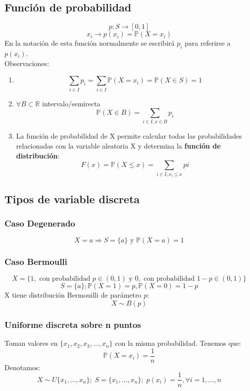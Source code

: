 \documentclass[11pt]{article}
\newcommand{\R}{\mathbb{R}}
\newcommand{\prob}{\mathbb{P}}
\theoremstyle{plain}
\begin{document}
        \subsection{Función de probabilidad} %
        \label{sub:función_de_probabilidad}
            \[p:S \rightarrow [0,1]\]
            \[x_i \rightarrow p(x_i) = \prob(X=x_i)\]
        En la notación de esta función normalmente se escribirá $p_i$ para referirse a $p(x_i)$.\\
        Observaciones:
        \begin{enumerate}[label=\Alph*]
            \item \[\sum_{i\in I} p_i = \sum_{i\in I} \prob(X = x_i) = \prob(X \in S) = 1\]
            \item $\forall B \subset \R$ intervalo/semirecta 
            \[\prob(X\in B) = \sum_{i\in I, x\in B} p_i\]
            \item La función de probabilidad de X permite calcular todas las probabilidades relacionadas con la variable aleatoria X y determina la \textbf{función de distribución}:
            \[F(x) = \prob(X\le x) = \sum_{i\in I, x_i \le x} pi\]
        \end{enumerate}
        \subsection{Tipos de variable discreta} %
        \label{sub:tipos_de_variable_discreta}
            \subsubsection{Caso Degenerado} %
            \label{subsub:caso_degenerado}
                \[X = a \Rightarrow S = \{a\} \text{ y } \prob(X=a) = 1\]
            \subsubsection{Caso Bermoulli} %
            \label{subsub:caso_bermoulli}
                \[X = \{1, \text{ con probabilidad }p\in(0,1)\text{ y } 0,\text{ con probabilidad } 1 -p\in(0,1) \}\]
                \[S = \{a\}; \prob(X=1) = p, \prob(X=0) = 1 - p \]
                X tiene distribución Bermouilli de parámetro $p$:
                \[X \sim B(p) \]
            \subsubsection{Uniforme discreta sobre n puntos} %
            \label{subsub:uniforme_discreta_sobre_n_puntos}
                Toman valores en $\{x_1,x_2,x_3,...,x_n\}$ con la misma probabilidad. Tenemos que:
                \[\prob(X=x_i) = \frac{1}{n}\]
                Denotamos:
                \[X \sim U\{x_1,...,x_n\}; \; S=\{x_1,...,x_n\} ; \; p(x_i) = \frac{1}{n}, \forall i=1,...,n\]
\end{document}
